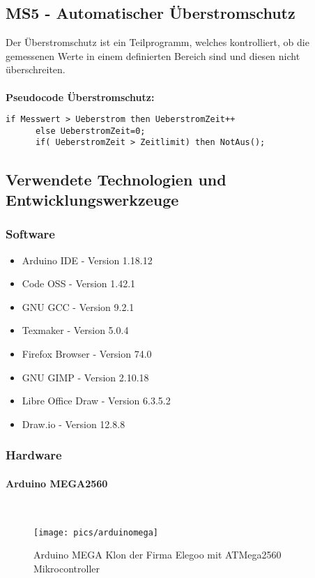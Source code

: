 \documentclass[12pt,a4paper]{article}
\begin{document}
\subsection{MS5 - Automatischer Überstromschutz}
Der Überstromschutz ist ein Teilprogramm, welches kontrolliert, ob die gemessenen Werte in einem definierten Bereich sind und diesen nicht überschreiten. \\\\
{\bf Pseudocode Überstromschutz:}
\begin{lstlisting}[frame=single]
if Messwert > Ueberstrom then UeberstromZeit++
      else UeberstromZeit=0;
      if( UeberstromZeit > Zeitlimit) then NotAus();
\end{lstlisting}
%
%
\newpage
\subsection{Verwendete Technologien und Entwicklungswerkzeuge}
\subsubsection*{Software}
\begin{itemize}
\item Arduino IDE - Version 1.18.12
\item Code OSS - Version 1.42.1
\item GNU GCC - Version 9.2.1
\item Texmaker - Version 5.0.4
\item Firefox Browser - Version 74.0
\item GNU GIMP - Version 2.10.18
\item Libre Office Draw - Version 6.3.5.2
\item Draw.io - Version 12.8.8
\end{itemize}
%
\vspace{10mm}
\subsubsection*{Hardware}
%
\paragraph{Arduino MEGA2560}\mbox{}\\
\begin{figure}[h!]
	\centering
	\texttt{[image: pics/arduinomega]}
	\caption{Arduino MEGA Klon der Firma Elegoo mit ATMega2560 Mikrocontroller}
\end{figure}
%
\newpage
\end{document}
